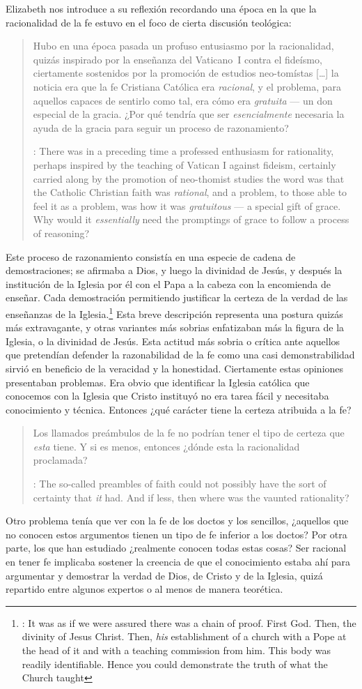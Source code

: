 Elizabeth nos introduce a su reflexión recordando una época en la que la racionalidad de la fe estuvo en el foco de cierta discusión teológica: \blockquote[{\cite[113]{anscombe1981erp:faith}}: There was in a preceding time a professed enthusiasm for rationality, perhaps inspired by the teaching of Vatican I against fideism, certainly carried along by the promotion of neo-thomist studies \textelp{} the word was that the Catholic Christian faith was \emph{rational}, and a problem, to those able to feel it as a problem, was how it was \emph{gratuitous} --- a special gift of grace. Why would it \emph{essentially} need the promptings of grace to follow a process of reasoning?]{Hubo en una época pasada un profuso entusiasmo por la racionalidad, quizás inspirado por la enseñanza del Vaticano~I contra el fideísmo, ciertamente sostenidos por la promoción de estudios neo-tomístas [\ldots] la noticia era que la fe Cristiana Católica era \emph{racional}, y el problema, para aquellos capaces de sentirlo como tal, era cómo era \emph{gratuita} --- un don especial de la gracia. ¿Por qué tendría que ser \emph{esencialmente} necesaria la ayuda de la gracia para seguir un proceso de razonamiento?}. Este proceso de razonamiento consistía en una especie de cadena de demostraciones; se afirmaba a Dios, y luego la divinidad de Jesús, y después la institución de la Iglesia por él con el Papa a la cabeza con la encomienda de enseñar. Cada demostración permitiendo justificar la certeza de la verdad de las enseñanzas de la Iglesia.\footnote{\cite[Cf.~][12]{anscombe1981erp:faith}: It was as if we were assured there was a chain of proof. First God. Then, the divinity of Jesus Christ. Then, \emph{his} establishment of a church with a Pope at the head of it and with a teaching commission from him. This body was readily identifiable. Hence you could demonstrate the truth of what the Church taught} Esta breve descripción representa una postura quizás más extravagante, y otras variantes más sobrias enfatizaban más la figura de la Iglesia, o la divinidad de Jesús. Esta actitud más sobria o crítica ante aquellos que pretendían defender la razonabilidad de la fe como una casi demonstrabilidad sirvió en beneficio de la veracidad y la honestidad. Ciertamente estas opiniones presentaban problemas. Era obvio que identificar la Iglesia católica que conocemos con la Iglesia que Cristo instituyó no era tarea fácil y necesitaba conocimiento y técnica. Entonces ¿qué carácter tiene la certeza atribuida a la fe? \blockquote[{\cite[114]{anscombe1981erp:faith}}: The so-called preambles of faith could not possibly have the sort of certainty that \emph{it} had. And if less, then where was the vaunted rationality?]{Los llamados preámbulos de la fe no podrían tener el tipo de certeza que \emph{esta} tiene. Y si es menos, entonces ¿dónde esta la racionalidad proclamada?}. Otro problema tenía que ver con la fe de los doctos y los sencillos, ¿aquellos que no conocen estos argumentos tienen un tipo de fe inferior a los doctos? Por otra parte, los que han estudiado ¿realmente conocen todas estas cosas? Ser racional en tener fe implicaba sostener la creencia de que el conocimiento estaba ahí para argumentar y demostrar la verdad de Dios, de Cristo y de la Iglesia, quizá repartido entre algunos expertos o al menos de manera teorética. 